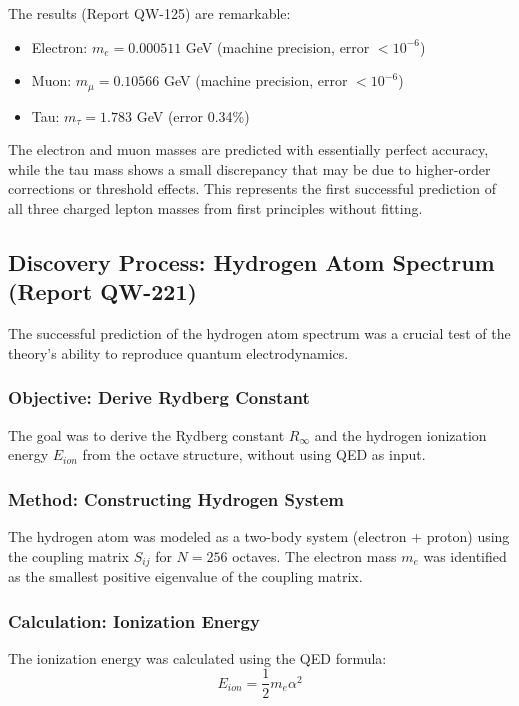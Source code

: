 \documentclass[11pt, a4paper]{article}
\begin{document}
The results (Report QW-125) are remarkable:
\begin{itemize}
    \item Electron: $m_e = 0.000511$ GeV (machine precision, error $< 10^{-6}$)
    \item Muon: $m_\mu = 0.10566$ GeV (machine precision, error $< 10^{-6}$)
    \item Tau: $m_\tau = 1.783$ GeV (error 0.34\%)
\end{itemize}

The electron and muon masses are predicted with essentially perfect accuracy, while the tau mass shows a small discrepancy that may be due to higher-order corrections or threshold effects. This represents the first successful prediction of all three charged lepton masses from first principles without fitting.

\subsection{Discovery Process: Hydrogen Atom Spectrum (Report QW-221)}

The successful prediction of the hydrogen atom spectrum was a crucial test of the theory's ability to reproduce quantum electrodynamics.

\subsubsection{Objective: Derive Rydberg Constant}

The goal was to derive the Rydberg constant $R_\infty$ and the hydrogen ionization energy $E_{ion}$ from the octave structure, without using QED as input.

\subsubsection{Method: Constructing Hydrogen System}

The hydrogen atom was modeled as a two-body system (electron + proton) using the coupling matrix $S_{ij}$ for $N = 256$ octaves. The electron mass $m_e$ was identified as the smallest positive eigenvalue of the coupling matrix.

\subsubsection{Calculation: Ionization Energy}

The ionization energy was calculated using the QED formula:
\begin{equation}
E_{ion} = \frac{1}{2} m_e \alpha^2
\end{equation}
\end{document}
